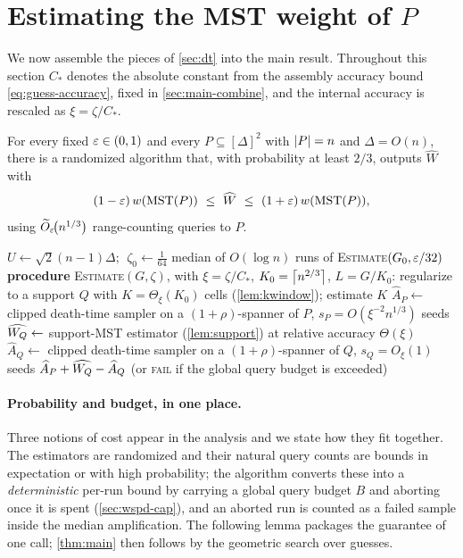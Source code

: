 \section{Estimating the MST weight of \texorpdfstring{$P$}{P}}\label{sec:main}

We now assemble the pieces of \cref{sec:dt} into the main result. Throughout this section $C_*$ denotes the
absolute constant from the assembly accuracy bound \eqref{eq:guess-accuracy}, fixed in
\cref{sec:main-combine}, and the internal accuracy is rescaled as $\xi=\zeta/C_*$.

\begin{theorem}[Main]\label{thm:main}
For every fixed $\varepsilon\in(0,1)$ and every $P\subseteq[\Delta]^2$ with $\left|P\right|=n$ and $\Delta=O(n)$, there
is a randomized algorithm that, with probability at least $2/3$, outputs $\widehat W$ with
\[
  (1-\varepsilon)\,w(\mathrm{MST}(P))\ \le\ \widehat W\ \le\ (1+\varepsilon)\,w(\mathrm{MST}(P)),
\]
using $\widetilde{O}_\varepsilon\!\bigl(n^{1/3}\bigr)$ range-counting queries to $P$.
\end{theorem}

\begin{algorithm}[t]
\caption{Estimating $W=\wt(\MST(P))$ to a $(1\pm\eps)$ factor}\label{alg:main}
$U\leftarrow\sqrt2(n-1)\Delta$; $\;\zeta_0\leftarrow\tfrac1{64}$\;
\Return median of $O(\log n)$ runs of \textsc{Estimate}$(G_0,\varepsilon/32)$\;
\medskip
\textbf{procedure} \textsc{Estimate}$(G,\zeta)$, with $\xi=\zeta/C_*$, $K_0=\left\lceil n^{2/3} \right\rceil$, $L=G/K_0$:\;
\Indp
regularize to a support $Q$ with $K=\Theta_\xi(K_0)$ cells (\cref{lem:kwindow}); estimate $K$\;
$\widehat A_P\leftarrow$ clipped death-time sampler on a $(1{+}\rho)$-spanner of $P$, $s_P=O(\xi^{-2}n^{1/3})$ seeds\;
$\widehat{W_Q}\leftarrow$ support-MST estimator (\cref{lem:support}) at relative accuracy $\Theta(\xi)$\;
$\widehat A_Q\leftarrow$ clipped death-time sampler on a $(1{+}\rho)$-spanner of $Q$, $s_Q=O_\xi(1)$ seeds\;
\Return $\widehat A_P+\widehat{W_Q}-\widehat A_Q$ (or \textsc{fail} if the global query budget is exceeded)\;
\end{algorithm}

\paragraph{Probability and budget, in one place.}
Three notions of cost appear in the analysis and we state how they fit together. The estimators are
randomized and their natural query counts are bounds in expectation or with high probability; the algorithm
converts these into a \emph{deterministic} per-run bound by carrying a global query budget $B$ and aborting
once it is spent (\cref{sec:wspd-cap}), and an aborted run is counted as a failed sample inside the median
amplification. The following lemma packages the guarantee of one call; \cref{thm:main} then follows by the
geometric search over guesses.

